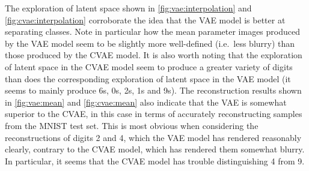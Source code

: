 The exploration of latent space shown in \cref{fig:vae:interpolation} and \cref{fig:cvae:interpolation} corroborate the idea that the VAE model is better at separating classes. Note in particular how the mean parameter images produced by the VAE model seem to be slightly more well-defined (i.e.\ less blurry) than those produced by the CVAE model. It is also worth noting that the exploration of latent space in the CVAE model seem to produce a greater variety of digits than does the corresponding exploration of latent space in the VAE model (it seems to mainly produce 6s, 0s, 2s, 1s and 9s). The reconstruction results shown in \cref{fig:vae:mean} and \cref{fig:cvae:mean} also indicate that the VAE is somewhat superior to the CVAE, in this case in terms of accurately reconstructing samples from the MNIST test set. This is most obvious when considering the reconstructions of digits 2 and 4, which the VAE model has rendered reasonably clearly, contrary to the CVAE model, which has rendered them somewhat blurry. In particular, it seems that the CVAE model has trouble distinguishing 4 from 9. 
